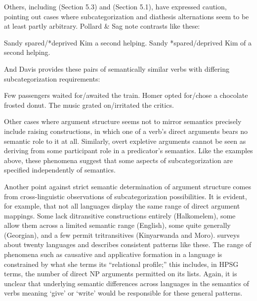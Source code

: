 \documentclass[output=paper]{langsci/langscibook}
\begin{document}
Others, including \citet{ps} (Section 5.3) and \citet{Davis2001} (Section 5.1), have expressed caution, pointing out cases where subcategorization and diathesis alternations seem to be at least partly arbitrary.
Pollard \& Sag note contrasts like these:

\begin{exe}
\ex \label{ps-subcat-ex}
\begin{xlist}
\ex    Sandy spared/*deprived Kim a second helping.
\ex    Sandy *spared/deprived Kim of a second helping.
\citep[ex. 214--215]{ps}
\end{xlist}
\end{exe}

\noindent
And Davis provides these pairs of semantically similar verbs with differing subcategorization requirements:

\begin{exe}
\ex \label{ard-subcat-ex}
\begin{xlist}
\ex    Few passengers waited for/awaited the train.
\ex    Homer opted for/chose a chocolate frosted donut.
\ex    The music grated on/irritated the critics.
\citep[ex. 5.4]{Davis2001}
\end{xlist}
\end{exe}

Other cases where argument structure seems not to mirror semantics precisely include raising constructions, in which one of a verb's direct arguments bears no semantic role to it at all.
Similarly, overt expletive arguments cannot be seen as deriving from some participant role in a predicator's semantics.
Like the examples above, these phenomena suggest that some aspects of subcategorization are specified independently of semantics.

Another point against strict semantic determination of argument structure comes from cross-linguistic observations of subcategorization possibilities.
It is evident, for example, that not all languages display the same range of direct argument mappings.
Some lack ditransitive constructions entirely (Halkomelem), some allow them across a limited semantic range (English), some quite generally (Georgian), and a few permit tritransitives (Kinyarwanda and Moro).
\citet{Gerdts1992} surveys about twenty languages and describes consistent patterns like these.
The range of phenomena such as causative and applicative formation in a language is constrained by what she terms its ``relational profile;'' this includes, in HPSG terms, the number of direct NP arguments permitted on its \argst lists.
Again, it is unclear that underlying semantic differences across languages in the semantics of verbs meaning `give' or `write' would be responsible for these general patterns.
\end{document}
